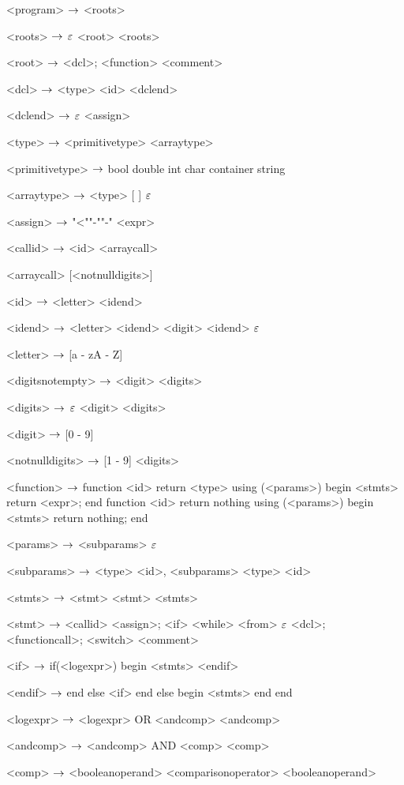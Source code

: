 \begin{grammar}
<program> $\rightarrow$ <roots>

<roots> $\rightarrow$ $\varepsilon$
\alt <root> <roots>

<root> $\rightarrow$ <dcl>;
\alt <function>
\alt <comment>

<dcl> $\rightarrow$ <type> <id> <dclend>

<dclend> $\rightarrow$ $\varepsilon$
\alt <assign> 

<type> $\rightarrow$ <primitivetype> <arraytype>

<primitivetype> $\rightarrow$ bool
\alt double
\alt int
\alt char
\alt container
\alt string

<arraytype> $\rightarrow$ <type> [ ]
\alt $\varepsilon$


<assign>  $\rightarrow$ "<""-""-" <expr>

<callid> $\rightarrow$ <id>
\alt <arraycall>

<arraycall> [<notnulldigits>]

<id> $\rightarrow$ <letter> <idend>

<idend> $\rightarrow$ <letter> <idend>
	\alt <digit> <idend>
	\alt $\varepsilon$

<letter> $\rightarrow$ [a - zA - Z]

<digitsnotempty> $\rightarrow$ <digit> <digits>

<digits> $\rightarrow$ $\varepsilon$
\alt <digit> <digits>

<digit> $\rightarrow$ [0 - 9]

<notnulldigits> $\rightarrow$ [1 - 9] <digits>

<function> $\rightarrow$  function <id> return <type> using (<params>)
begin
	<stmts>
	return <expr>;
end
\alt function <id> return nothing using (<params>)
begin
	<stmts>
	return nothing;
end

<params> $\rightarrow$ <subparams>
	\alt $\varepsilon$

<subparams> $\rightarrow$ <type> <id>, <subparams>
\alt <type> <id>

<stmts> $\rightarrow$ <stmt>
	\alt <stmt> <stmts>

<stmt> $\rightarrow$ <callid> <assign>;
	\alt <if>
	\alt <while>
	\alt <from>
	\alt $\varepsilon$
	\alt <dcl>;
	\alt <functioncall>;
	\alt <switch>
	\alt <comment>
	
<if> $\rightarrow$ if(<logexpr>)
	begin
		<stmts>
	<endif>

<endif> $\rightarrow$ end
	else <if>
	\alt end
	else
	begin
		<stmts>
	end
	\alt end
	 
<logexpr> $\rightarrow$ <logexpr> OR <andcomp>
		\alt <andcomp>

<andcomp> $\rightarrow$ <andcomp> AND <comp>

<comp> $\rightarrow$ <booleanoperand> <comparisonoperator> <booleanoperand>


\end{grammar}
